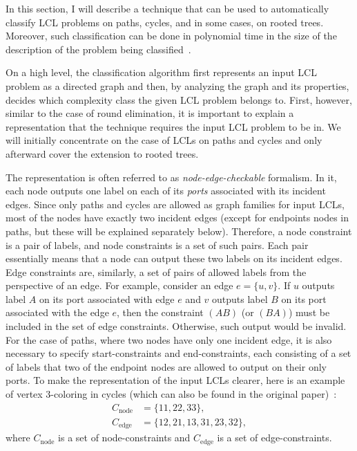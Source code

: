 In this section, I will describe a technique that can be used to automatically
classify LCL problems on paths, cycles, and in some cases, on rooted trees.
Moreover, such classification can be done in polynomial time in the size
of the description of the problem being classified~\cite{Chang2020}.

On a high level, the classification algorithm first represents an input LCL problem as
a directed graph and then, by analyzing the graph and its properties, decides
which complexity class the given LCL problem belongs to. First, however, similar to
the case of round elimination, it is important to explain a representation that
the technique requires the input LCL problem to be in. We will initially concentrate on the case
of LCLs on paths and cycles and only afterward cover the extension to rooted trees.

The representation is often referred to as \emph{node-edge-checkable} formalism.
In it, each node outputs one label on each of its \emph{ports} associated with
its incident edges. Since only paths and cycles are allowed as graph families for
input LCLs, most of the nodes have exactly two incident edges (except for endpoints nodes
in paths, but these will be explained separately below). Therefore, a node constraint
is a pair of labels, and node constraints is a set of such pairs. Each pair essentially
means that a node can output these two labels on its incident edges. Edge constraints are,
similarly, a set of pairs of allowed labels from the perspective of an edge. For example,
consider an edge $e = \{u, v\}$. If $u$ outputs label $A$ on its port associated with edge $e$
and $v$ outputs label $B$ on its port associated with the edge $e$, then the constraint $(AB)$
(or $(BA)$) must be included in the set of edge constraints. Otherwise, such output
would be invalid. For the case of paths, where two nodes have only one incident edge, it is also
necessary to specify start-constraints and end-constraints, each consisting of a set of labels
that two of the endpoint nodes are allowed to output on their only ports. To make the
representation of the input LCLs clearer, here is an example of vertex 3-coloring in cycles
(which can also be found in the original paper)~\cite{Chang2020}:
\begin{align*}
  C_{\textrm{node}} &= \{ 11, 22, 33 \}, \\
  C_{\textrm{edge}} &= \{ 12, 21, 13, 31, 23, 32 \},
\end{align*}
where $C_{\textrm{node}}$ is a set of node-constraints and $C_{\textrm{edge}}$ is a set of edge-constraints.

